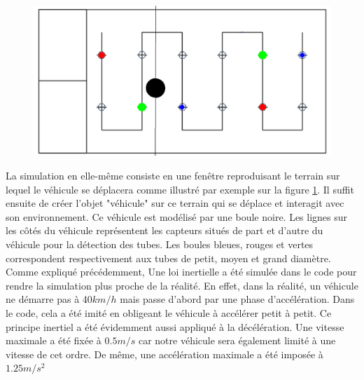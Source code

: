 \documentclass[a4paper,11pt]{article}
\begin{document}
\begin{figure}[H]
    \centering
    \includegraphics[scale = 0.2]{simu_cyl.png}
    \label{vehmouv}
\end{figure}

 La simulation en elle-même consiste en une fenêtre reproduisant le terrain sur lequel le véhicule se déplacera comme illustré par exemple sur la figure \ref{vehmouv}. Il suffit ensuite de créer l'objet "véhicule" sur ce terrain qui se déplace et interagit avec son environnement. Ce véhicule est modélisé par une boule noire. Les lignes sur les côtés du véhicule représentent les capteurs situés de part et d'autre du véhicule pour la détection des tubes. Les boules bleues, rouges et vertes correspondent respectivement aux tubes de petit, moyen et grand diamètre.\\
 
 Comme expliqué précédemment, Une loi inertielle a été simulée dans le code pour rendre la simulation plus proche de la réalité. En effet, dans la réalité, un véhicule ne démarre pas à 40$km/h$ mais passe d'abord par une phase d'accélération. Dans le code, cela a été imité en obligeant le véhicule à accélérer petit à petit. Ce principe inertiel a été évidemment aussi appliqué à la décélération. Une vitesse maximale a été fixée à $0.5m/s$ car notre véhicule sera également limité à une vitesse de cet ordre. De même, une accélération maximale a été imposée à $1.25m/s^2$
 
\end{document}
